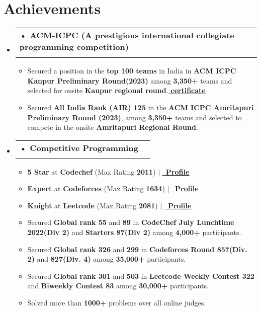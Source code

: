 \documentclass[letterpaper,11pt]{article}
\makeatletter
\newcommand{\resumeItem}[1]{
  \item\small{
	{#1 \vspace{-2pt}}
  }
}
\newcommand{\resumeSubheading}[4]{
  \vspace{-2pt}\item
	\begin{tabular*}{1.0\textwidth}[t]{l@{\extracolsep{\fill}}r}
  	\textbf{#1} & \textbf{\small #2} \\
  	\textit{\small#3} & \textit{\small #4} \\
	\end{tabular*}\vspace{-7pt}
}
\newcommand{\resumeSubHeadingListStart}{\begin{itemize}[leftmargin=0.0in, label={}]}
\newcommand{\resumeSubHeadingListEnd}{\end{itemize}}
\newcommand{\resumeItemListStart}{\begin{itemize}}
\newcommand{\resumeItemListEnd}{\end{itemize}\vspace{-5pt}}
\makeatother
\begin{document}
\section{Achievements }
 \begin{itemize}[leftmargin=0.12in, label={}]
 
  \vspace{-7pt}
   \resumeSubHeadingListStart
   
	\resumeSubheading {\hspace{-5pt}• ACM-ICPC (A prestigious international collegiate programming competition)}{}{}{}
  	\resumeItemListStart
          \vspace{-10pt}
    	 \resumeItem{Secured a position in the \textbf{top 100 teams} in India in \textbf{ACM ICPC Kanpur Preliminary Round(2023)} among \textbf{3,350+} teams and selected for onsite \textbf{Kanpur regional round}.\href{https://drive.google.com/file/d/1sUR4C4kflMksb_Nc_zEKh23p0UzkzqAj/view?usp=sharing}{  \underline{\textbf{certificate}}}   }
         \resumeItem{Secured  \textbf{All India Rank (AIR) 125} in the \textbf{ACM ICPC Amritapuri Preliminary Round (2023)}, among \textbf{3,350+} teams and selected to compete in the onsite \textbf{Amritapuri Regional Round}.}  
	  \resumeItemListEnd
        \vspace{-5pt}

   \resumeSubheading {\hspace{-5pt}• Competitive Programming}{}{}{}
	\resumeItemListStart
        \vspace{-10pt}
    	\resumeItem{\textbf{5 Star} at \textbf{Codechef} (Max Rating \textbf{2011}) $|$  \href{https://www.codechef.com/users/abhi_kant/}{\small \raisebox{-0.2\height}\faLink\  \underline{\textbf{Profile}}}  }
     
        \resumeItem{\textbf{Expert} at \textbf{Codeforces} (Max Rating \textbf{1634}) $|$  \href{https://codeforces.com/profile/abhi_kant}{\small \raisebox{-0.2\height}\faLink\  \underline{\textbf{Profile}}}  }
        
        \resumeItem{\textbf{Knight} at \textbf{Leetcode} (Max Rating \textbf{2081}) $|$  \href{https://leetcode.com/abhi1911/}{\small \raisebox{-0.2\height}\faLink\  \underline{\textbf{Profile}}}  }

    	\resumeItem{Secured \textbf{Global rank 55} and \textbf{89} in \textbf{CodeChef July Lunchtime 2022(Div 2)} and \textbf{Starters 87(Div 2)} among \textbf{4,000+} participants.}
	\resumeItem{Secured \textbf{Global rank 326} and \textbf{299} in \textbf{Codeforces Round 857(Div. 2)} and \textbf{827(Div. 4)} among \textbf{35,000+} participants.}
\resumeItem{Secured \textbf{Global rank 301} and \textbf{503} in \textbf{Leetcode Weekly Contest 322} and \textbf{Biweekly Contest 83} among \textbf{30,000+} participants.}
    	\resumeItem{Solved more than \textbf{1000+} problems over all online judges.}
	  \resumeItemListEnd
   
  \resumeSubHeadingListEnd
 \end{itemize}
\vspace{-11pt}
\end{document}
